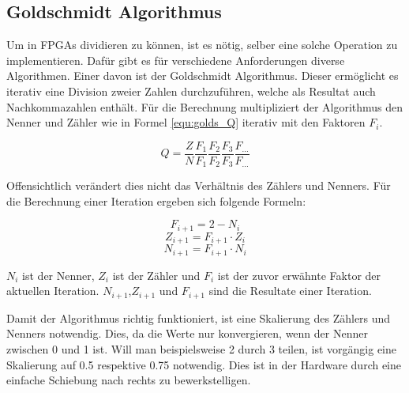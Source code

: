 
\subsection{Goldschmidt Algorithmus}\label{subsec:Goldschmidt}

Um in FPGAs dividieren zu können, ist es nötig, selber eine solche Operation zu implementieren. Dafür gibt es für verschiedene Anforderungen diverse Algorithmen. Einer davon ist der Goldschmidt Algorithmus. Dieser ermöglicht es iterativ eine Division zweier Zahlen durchzuführen, welche als Resultat auch Nachkommazahlen enthält. Für die Berechnung multipliziert der Algorithmus den Nenner und Zähler wie in Formel \ref{equ:golds_Q} iterativ mit den Faktoren \(F_i\).

\begin{equation}
Q = \frac{Z}{N}\frac{F_1}{F_1}\frac{F_2}{F_2}\frac{F_3}{F_3}\frac{F_{...}}{F_{...}}
\label{equ:golds_Q}
\end{equation}

Offensichtlich verändert dies nicht das Verhältnis des Zählers und Nenners. Für die Berechnung einer Iteration ergeben sich folgende Formeln:

\begin{equation}
F_{i+1} = 2 - N_i
\label{equ:golds_Fi+1}
\end{equation}
\begin{equation}
Z_{i+1} = F_{i+1}\cdot Z_i
\label{equ:golds_Zi+1}
\end{equation}
\begin{equation}
N_{i+1} = F_{i+1}\cdot N_i
\label{equ:golds_Ni+1}
\end{equation}

\(N_i\) ist der Nenner, \(Z_i\) ist der Zähler und \(F_i\) ist der zuvor erwähnte Faktor der aktuellen Iteration. \(N_{i+1}\),\(Z_{i+1}\) und \(F_{i+1}\) sind die Resultate einer Iteration.

Damit der Algorithmus richtig funktioniert, ist eine Skalierung des Zählers und Nenners notwendig. Dies, da die Werte nur konvergieren, wenn der Nenner zwischen 0 und 1 ist. Will man beispielsweise 2 durch 3 teilen, ist vorgängig eine Skalierung auf 0.5 respektive 0.75 notwendig. Dies ist in der Hardware durch eine einfache Schiebung nach rechts zu bewerkstelligen.